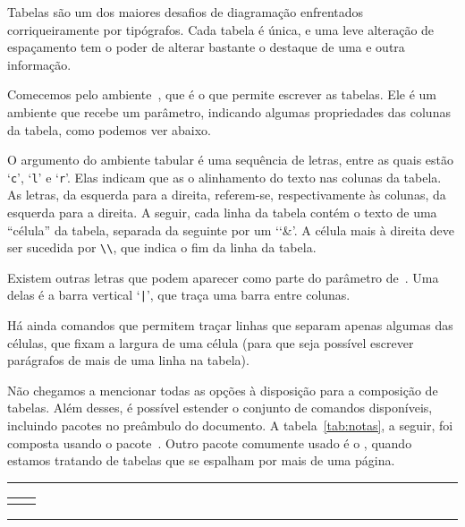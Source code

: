 Tabelas são um dos maiores desafios de diagramação enfrentados
corriqueiramente por tipógrafos. Cada tabela é única, e uma leve
alteração de espaçamento tem o poder de alterar bastante o destaque de
uma e outra informação.

Comecemos pelo ambiente~, que é o que permite
escrever as tabelas. Ele é um ambiente que recebe um parâmetro,
indicando algumas propriedades das colunas da tabela, como podemos ver abaixo.

O argumento do ambiente tabular é uma sequência de letras, entre as
quais estão `{\tt c}', `{\tt l}' e `{\tt r}'. Elas indicam que as
o alinhamento do texto nas colunas da tabela. As letras, da esquerda
para a direita, referem-se, respectivamente às colunas, da esquerda
para a direita. A seguir, cada linha da tabela contém o texto de uma
``célula'' da tabela, separada da seguinte por um `\char`\&'. A célula
mais à direita deve ser sucedida por \verb'\\', que indica o fim da
linha da tabela.

Existem outras letras que podem aparecer como parte do parâmetro
de~. Uma delas é a barra vertical `{\tt |}', que
traça uma barra entre colunas. 

Há ainda comandos que permitem traçar linhas que separam apenas algumas das
células, que fixam a largura de uma célula (para que seja possível
escrever parágrafos de mais de uma linha na tabela). 

Não chegamos a mencionar todas as opções à disposição para a
composição de tabelas. Além desses, é possível estender o conjunto de
comandos disponíveis, incluindo pacotes no preâmbulo do documento. A
tabela~\ref{tab:notas}, a seguir, foi composta usando o
pacote~. Outro pacote comumente usado é o
, quando estamos tratando de tabelas que se espalham
por mais de uma página.

\medskip
\begin{center}\hrule\smallskip
\begin{tabular}{c|c}
\begin{minipage}{.405\textwidth}\footnotesize

\end{minipage} &
\begin{minipage}{.535\textwidth}

\end{minipage}
\end{tabular}
\smallskip\hrule
\end{center}
\medskip



